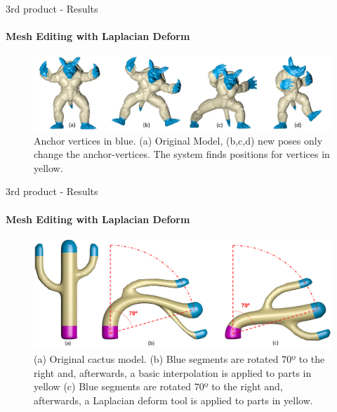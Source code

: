 \documentclass[10pt, compress, english]{beamer}
\begin{document}
\begin{frame}{3rd product - Results}


\framesubtitle{Mesh Editing with Laplacian Deform}


\begin{figure}[H]
\noindent \begin{centering}
\includegraphics[width=1\textwidth]{img/Armadillo}
\par\end{centering}

\protect\caption{Anchor vertices in blue. (a) Original Model, (b,c,d) new poses only
change the anchor-vertices. The system finds positions for vertices
in yellow.}
\end{figure}


\end{frame}

\begin{frame}{3rd product - Results}


\framesubtitle{Mesh Editing with Laplacian Deform}


\begin{figure}[H]
\includegraphics[width=1\textwidth]{img/cactus}

\protect\caption{(a) Original cactus model. (b) Blue segments are rotated 70º to the
right and, afterwards, a basic interpolation is applied to parts
in yellow (c) Blue segments are rotated 70º to the right and, afterwards,
a Laplacian deform tool is applied to parts in yellow.}
\end{figure}


\end{frame}
\end{document}
